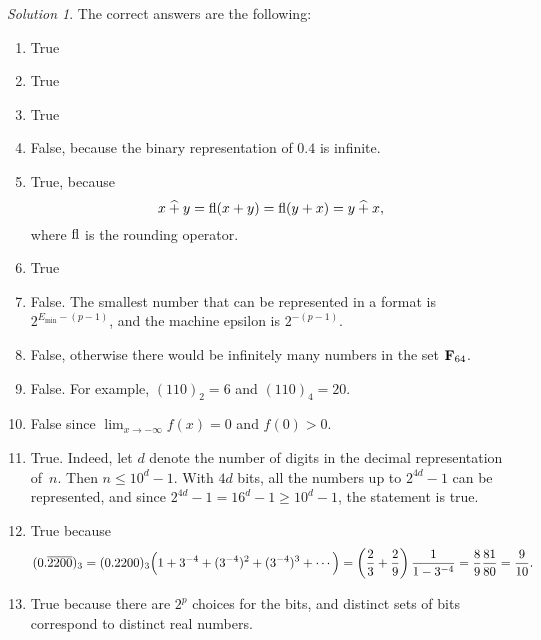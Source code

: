 \documentclass[11pt]{article}
\theoremstyle{definition}
\theoremstyle{remark}
\newtheorem*{solution}{Solution}
\begin{document}
\newpage
\begin{solution}
    The correct answers are the following:
    \begin{enumerate}
        \item True
        \item True
        \item True
        \item False, because the binary representation of $0.4$ is infinite.
        \item
            True, because
            \[
                x \mathbin{\widehat +} y = {\rm fl} (x + y) = {\rm fl} (y + x) = y \mathbin{\widehat +} x,
            \]
            where ${\rm fl}$ is the rounding operator.
        \item True
        \item
            False.
            The smallest number that can be represented in a format is $2^{E_{\min}-(p-1)}$,
            and the machine epsilon is $2^{-(p-1)}$.
        \item
            False, otherwise there would be infinitely many numbers in the set $\mathbf F_{64}$.

        \item
            False. For example, $(110)_2 = 6$ and $(110)_4 = 20$.

        \item
            False since $\lim_{x \to -\infty} f(x) = 0$ and $f(0) > 0$.

        \item
            True. Indeed, let $d$ denote the number of digits in the decimal representation of~$n$.
            Then $n \leq 10^d - 1$.
            With $4d$ bits, all the numbers up to $2^{4d}- 1$ can be represented,
            and since $2^{4d} - 1 = 16^d - 1 \geq 10^d - 1$,
            the statement is true.

        \item
            True because
            \[
                (0.\overline{2200})_3 = (0.2200)_3 \Bigl(1 + 3^{-4} + (3^{-4})^2 + (3^{-4})^3 + \dotsb\Bigr)
                = \left(\frac{2}{3} + \frac{2}{9}\right)  \frac{1}{1 - 3^{-4}} = \frac{8}{9} \frac{81}{80} = \frac{9}{10}.
            \]

        \item
            True because there are $2^p$ choices for the bits,
            and distinct sets of bits correspond to distinct real numbers.
    \end{enumerate}
\end{solution}
\end{document}
